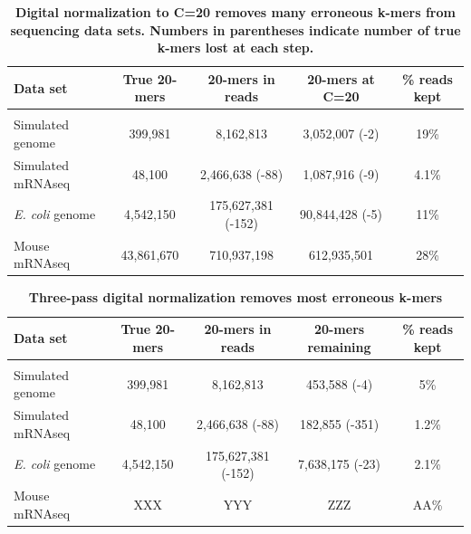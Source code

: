 \documentclass[10pt]{article}
\begin{document}
\begin{table}[!ht]
\caption{
\bf{Digital normalization to C=20 removes many erroneous k-mers from sequencing data sets.  Numbers
in parentheses indicate number of true k-mers lost at each step.}}
\begin{tabular}{|l|c|c|c|c|}
Data set & True 20-mers & 20-mers in reads & 20-mers at C=20 & \% reads kept\\
\hline \\
Simulated genome & 399,981 & 8,162,813 & 3,052,007 (-2) & 19\% \\
Simulated mRNAseq & 48,100 & 2,466,638 (-88) & 1,087,916 (-9) & 4.1\% \\
{\em E. coli} genome & 4,542,150 & 175,627,381 (-152) & 90,844,428 (-5) & 11\% \\
Mouse mRNAseq & 43,861,670 & 710,937,198 & 612,935,501 & 28\% \\

\end{tabular}
\begin{flushleft}
\end{flushleft}
\label{tab:normC20}
\end{table}


\begin{table}[!ht]
\caption{
\bf{Three-pass digital normalization removes most erroneous k-mers}}
\begin{tabular}{|l|c|c|c|c|}
Data set & True 20-mers & 20-mers in reads & 20-mers remaining & \% reads kept\\
\hline \\
Simulated genome & 399,981 & 8,162,813 & 453,588 (-4) & 5\% \\
Simulated mRNAseq & 48,100 & 2,466,638 (-88) & 182,855 (-351) & 1.2\% \\
{\em E. coli} genome & 4,542,150 & 175,627,381 (-152) & 7,638,175 (-23) & 2.1\% \\
Mouse mRNAseq & XXX & YYY & ZZZ & AA\% \\
\end{tabular}
\begin{flushleft}
\end{flushleft}
\label{tab:normC5}
\end{table}

\end{document}
